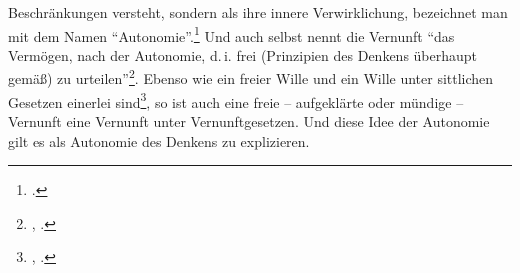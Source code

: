 Beschränkungen versteht, sondern als ihre innere Verwirklichung, bezeichnet man
mit dem Namen
\enquote{Autonomie}.\footnote{\cite[Vgl.][7]{Khurana:ParadoxienderAutonomie2011}.}
Und auch  selbst nennt die Vernunft \enquote{das Vermögen, nach der
Autonomie, {d.\,i.} frei (Prinzipien des Denkens überhaupt gemäß) zu
urteilen}\footnote{\cite[A~25]{Kant:DerStreitderFakultaeten1977}, \cite[VII:
27.30--31]{Kant:GesammelteWerke1900ff.}.}. Ebenso wie ein freier Wille und ein
Wille unter sittlichen Gesetzen einerlei
sind\footnote{\cite[Vgl.][BA~98]{Kant:GrundlegungzurMetaphysikderSitten1965},
\cite[IV: 447.6--7]{Kant:GesammelteWerke1900ff.}.}, so ist auch eine freie
-- aufgeklärte oder mündige -- Vernunft eine Vernunft unter Vernunftgesetzen.
Und diese Idee der Autonomie gilt es als Autonomie des Denkens zu explizieren.

